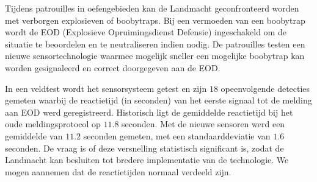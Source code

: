 \begin{question}{18}{
    Tijdens patrouilles in oefengebieden kan de Landmacht geconfronteerd worden met verborgen explosieven of boobytraps.
    Bij een vermoeden van een boobytrap wordt de EOD (Explosieve Opruimingsdienst Defensie) ingeschakeld om de situatie te beoordelen en te neutraliseren indien nodig.
    De patrouilles testen een nieuwe sensortechnologie waarmee mogelijk sneller een mogelijke boobytrap kan worden gesignaleerd en correct doorgegeven aan de EOD.

    In een veldtest wordt het sensorsysteem getest en zijn $18$ opeenvolgende detecties gemeten waarbij de reactietijd (in seconden) van het eerste signaal tot de melding aan EOD werd geregistreerd.
    Historisch ligt de gemiddelde reactietijd bij het oude meldingsprotocol op $11.8$ seconden.
    Met de nieuwe sensoren werd een gemiddelde van $11.2$ seconden gemeten, met een standaarddeviatie van $1.6$ seconden.
    De vraag is of deze versnelling statistisch significant is, zodat de Landmacht kan besluiten tot bredere implementatie van de technologie.
    We mogen aannemen dat de reactietijden normaal verdeeld zijn.
}
    
\end{question}
